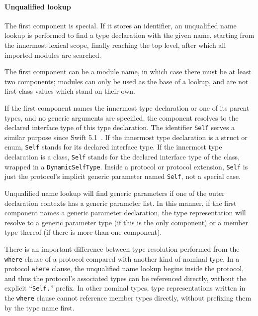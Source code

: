 \documentclass[a4paper,headsepline,bibliography=totoc,toc=flat,fleqn,twoside=semi]{scrbook}
\theoremstyle{definition}
\theoremstyle{definition}
\theoremstyle{definition}
\begin{document}
\paragraph{Unqualified lookup} The first component is special. If it stores an identifier, an unqualified name lookup is performed to find a type declaration with the given name, starting from the innermost lexical scope, finally reaching the top level, after which all imported modules are searched.

The first component can be a module name, in which case there must be at least two components; modules can only be used as the base of a lookup, and are not first-class values which stand on their own.

If the first component names the innermost type declaration or one of its parent types, and no generic arguments are specified, the component resolves to the declared interface type of this type declaration. The identifier \texttt{Self} serves a similar purpose since Swift 5.1~\cite{se0068}. If the innermost type declaration is a struct or enum, \texttt{Self} stands for its declared interface type. If the innermost type declaration is a class, \texttt{Self} stands for the declared interface type of the class, wrapped in a \texttt{DynamicSelfType}. Inside a protocol or protocol extension, \texttt{Self} is just the protocol's implicit generic parameter named \texttt{Self}, not a special case.

Unqualified name lookup will find generic parameters if one of the outer declaration contexts has a generic parameter list. In this manner, if the first component names a generic parameter declaration, the type representation will resolve to a generic parameter type (if this is the only component) or a member type thereof (if there is more than one component).

There is an important difference between type resolution performed from the \texttt{where} clause of a protocol compared with another kind of nominal type. In a protocol \texttt{where} clause, the unqualified name lookup begins inside the protocol, and thus the protocol's associated types can be referenced directly, without the explicit ``\texttt{Self.}'' prefix. In other nominal types, type representations written in the \texttt{where} clause cannot reference member types directly, without prefixing them by the type name first.
\end{document}
